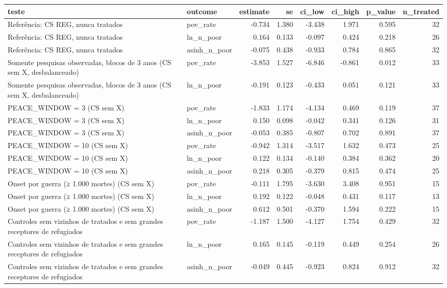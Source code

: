\begin{tabular}{llrrrrrr}
\toprule
teste & outcome & estimate & se & ci_low & ci_high & p_value & n_treated \\
\midrule
Referência: CS REG, nunca tratados & pov_rate & -0.734 & 1.380 & -3.438 & 1.971 & 0.595 & 32 \\
Referência: CS REG, nunca tratados & ln_n_poor & 0.164 & 0.133 & -0.097 & 0.424 & 0.218 & 26 \\
Referência: CS REG, nunca tratados & asinh_n_poor & -0.075 & 0.438 & -0.933 & 0.784 & 0.865 & 32 \\
Somente pesquisas observadas, blocos de 3 anos (CS sem X, desbalanceado) & pov_rate & -3.853 & 1.527 & -6.846 & -0.861 & 0.012 & 33 \\
Somente pesquisas observadas, blocos de 3 anos (CS sem X, desbalanceado) & ln_n_poor & -0.191 & 0.123 & -0.433 & 0.051 & 0.121 & 33 \\
PEACE_WINDOW = 3 (CS sem X) & pov_rate & -1.833 & 1.174 & -4.134 & 0.469 & 0.119 & 37 \\
PEACE_WINDOW = 3 (CS sem X) & ln_n_poor & 0.150 & 0.098 & -0.042 & 0.341 & 0.126 & 31 \\
PEACE_WINDOW = 3 (CS sem X) & asinh_n_poor & -0.053 & 0.385 & -0.807 & 0.702 & 0.891 & 37 \\
PEACE_WINDOW = 10 (CS sem X) & pov_rate & -0.942 & 1.314 & -3.517 & 1.632 & 0.473 & 25 \\
PEACE_WINDOW = 10 (CS sem X) & ln_n_poor & 0.122 & 0.134 & -0.140 & 0.384 & 0.362 & 20 \\
PEACE_WINDOW = 10 (CS sem X) & asinh_n_poor & 0.218 & 0.305 & -0.379 & 0.815 & 0.474 & 25 \\
Onset por guerra (≥ 1.000 mortes) (CS sem X) & pov_rate & -0.111 & 1.795 & -3.630 & 3.408 & 0.951 & 15 \\
Onset por guerra (≥ 1.000 mortes) (CS sem X) & ln_n_poor & 0.192 & 0.122 & -0.048 & 0.431 & 0.117 & 13 \\
Onset por guerra (≥ 1.000 mortes) (CS sem X) & asinh_n_poor & 0.612 & 0.501 & -0.370 & 1.594 & 0.222 & 15 \\
Controles sem vizinhos de tratados e sem grandes receptores de refugiados & pov_rate & -1.187 & 1.500 & -4.127 & 1.754 & 0.429 & 32 \\
Controles sem vizinhos de tratados e sem grandes receptores de refugiados & ln_n_poor & 0.165 & 0.145 & -0.119 & 0.449 & 0.254 & 26 \\
Controles sem vizinhos de tratados e sem grandes receptores de refugiados & asinh_n_poor & -0.049 & 0.445 & -0.923 & 0.824 & 0.912 & 32 \\

\end{tabular}
